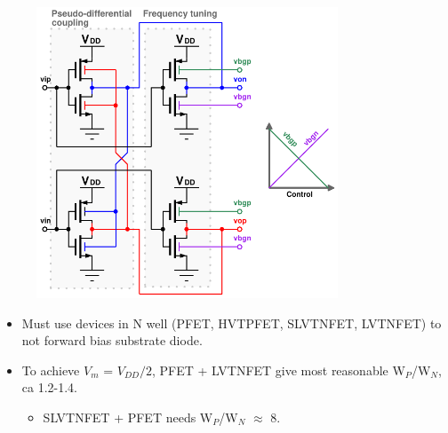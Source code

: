 			\begin{figure}[htb!]
			        \centering
			        \includegraphics[width=0.8\textwidth, angle=0]{./figs/parallel_delay_cell}
			\end{figure}


			\begin{itemize}[itemsep=4pt,label=\protect---]
				\item Must use devices in N well (PFET, HVTPFET, SLVTNFET, LVTNFET) to not forward bias substrate diode.
				\item To achieve $V_{m}$ =  $V_{DD}/2$, PFET + LVTNFET give most reasonable W$_P$/W$_N$, ca 1.2-1.4.
				\begin{itemize}[itemsep=4pt,label=$\bullet$]
					\item SLVTNFET + PFET needs W$_P$/W$_N$ $\approx$ 8.
				\end{itemize}
			\end{itemize}


